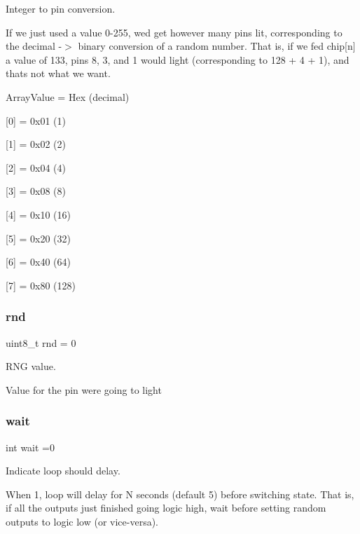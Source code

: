 Integer to pin conversion. 

If we just used a value 0-\/255, we\textquotesingle{}d get however many pins lit, corresponding to the decimal -\/$>$ binary conversion of a random number. That is, if we fed chip\mbox{[}n\mbox{]} a value of 133, pins 8, 3, and 1 would light (corresponding to 128 + 4 + 1), and that\textquotesingle{}s not what we want.

Array\+Value = Hex (decimal)
\begin{DoxyItemize}
\item \mbox{[}0\mbox{]} = 0x01 (1)
\item \mbox{[}1\mbox{]} = 0x02 (2)
\item \mbox{[}2\mbox{]} = 0x04 (4)
\item \mbox{[}3\mbox{]} = 0x08 (8)
\item \mbox{[}4\mbox{]} = 0x10 (16)
\item \mbox{[}5\mbox{]} = 0x20 (32)
\item \mbox{[}6\mbox{]} = 0x40 (64)
\item \mbox{[}7\mbox{]} = 0x80 (128) 
\end{DoxyItemize}\mbox{\label{SN74__RandomBlink_8ino_ad1a4ecf3125fbcc9447f70f7361f2fb0}} 
\subsubsection{\texorpdfstring{rnd}{rnd}}
{\footnotesize\ttfamily uint8\+\_\+t rnd = 0}



R\+NG value. 

Value for the pin we\textquotesingle{}re going to light \mbox{\label{SN74__RandomBlink_8ino_aaefdb10b18059f3c08332338630b3f68}} 
\subsubsection{\texorpdfstring{wait}{wait}}
{\footnotesize\ttfamily int wait =0}



Indicate loop should delay. 

When 1, loop will delay for N seconds (default 5) before switching state. That is, if all the outputs just finished going logic high, wait before setting random outputs to logic low (or vice-\/versa). 